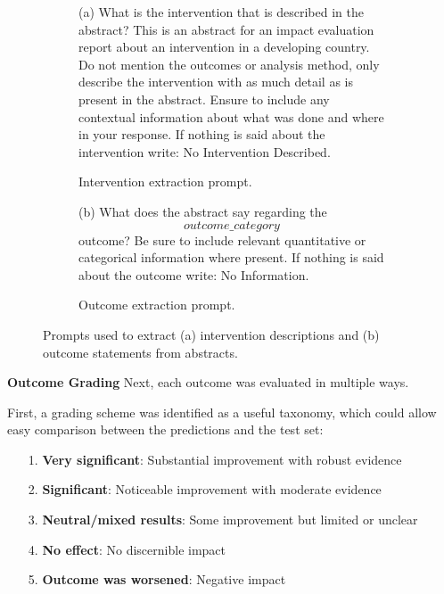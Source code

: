 \documentclass[12pt,a4paper]{article}
\begin{document}
\begin{figure}[htbp]
  \centering
  \begin{subfigure}{0.48\textwidth}
    \begin{tcolorbox}[left=4pt, right=4pt, top=4pt, bottom=4pt]
\ttfamily\footnotesize
(a)
What is the intervention that is described in the abstract? 
This is an abstract for an impact evaluation report about an intervention in a developing country. 
Do not mention the outcomes or analysis method, only describe the intervention with as much detail as is present in the abstract. 
Ensure to include any contextual information about what was done and where in your response. 
If nothing is said about the intervention write: No Intervention Described.
    \end{tcolorbox}
    \caption{Intervention extraction prompt.}
  \end{subfigure}\hfill
  \begin{subfigure}{0.48\textwidth}
    \begin{tcolorbox}[left=4pt, right=4pt, top=4pt, bottom=4pt]
\ttfamily\footnotesize
(b)
What does the abstract say regarding the \[outcome\_category\] outcome? 
Be sure to include relevant quantitative or categorical information where present. 
If nothing is said about the outcome write: No Information.
    \end{tcolorbox}
    \caption{Outcome extraction prompt.}
  \end{subfigure}
  \caption{Prompts used to extract (a) intervention descriptions and (b) outcome statements from abstracts.}
  \label{fig:prompts-ib}
\end{figure}

\textbf{Outcome Grading}
Next, each outcome was evaluated in multiple ways.

First, a grading scheme was identified as a useful taxonomy, which could allow easy comparison between the predictions and the test set:
\begin{itemize}
\item [1.] \textbf{Very significant}: Substantial improvement with robust evidence
\item [2.] \textbf{Significant}: Noticeable improvement with moderate evidence
\item [3.] \textbf{Neutral/mixed results}: Some improvement but limited or unclear
\item [4.] \textbf{No effect}: No discernible impact
\item [5.] \textbf{Outcome was worsened}: Negative impact
\end{itemize}
\end{document}

